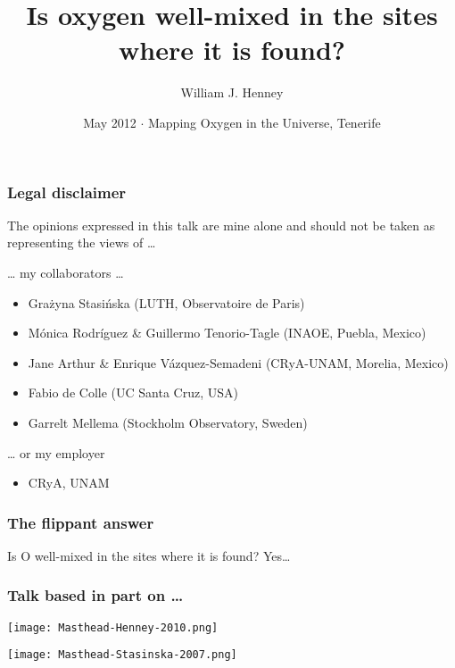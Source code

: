 \documentclass[presentation, compress]{beamer}
\title[Is oxygen well-mixed where it is found?]{Is oxygen well-mixed in the sites where it is found?}
\author{William J. Henney}
\institute[CRyA, UNAM]
{
  \structure{Centro de Radioastronomía y Astrofísica\\
  UNAM, Morelia, México}
}
\date[Tenerife 2012]{May 2012 \(\cdot\) Mapping Oxygen in the Universe, Tenerife}
\begin{document}
\maketitle




\begin{frame}
\frametitle{Legal disclaimer}
\label{sec-1-1}
\footnotesize

The opinions expressed in this talk are mine alone and should not be taken as representing the views of \ldots{}

\medskip
\begin{block}{\ldots{} my collaborators \ldots{}}
\begin{itemize}
\item Grażyna Stasińska (LUTH, Observatoire de Paris)
\item Mónica Rodríguez \& Guillermo Tenorio-Tagle (INAOE, Puebla, Mexico)
\item Jane Arthur \& Enrique Vázquez-Semadeni (CRyA-UNAM, Morelia, Mexico)
\item Fabio de Colle (UC Santa Cruz, USA)
\item Garrelt Mellema (Stockholm Observatory, Sweden)
\end{itemize}
\end{block}

\begin{block}{\ldots{} or my employer}
\begin{itemize}
\item CRyA, UNAM
\end{itemize}
\end{block}

\end{frame}


\begin{frame}
\frametitle{The flippant answer}
\label{sec-1-2}
\begin{block}{Is O well-mixed in the sites where it is found?}
\centering
Yes\ldots {} 
\end{block}
\end{frame}

\begin{frame}
  \frametitle{Talk based in part on \dots}
  \begin{block}{}\centering
    \bigskip
    \texttt{[image: Masthead-Henney-2010.png]}
  \end{block}
  \begin{block}{}\centering
    \bigskip
    \texttt{[image: Masthead-Stasinska-2007.png]}
  \end{block}
\end{frame}
\end{document}
